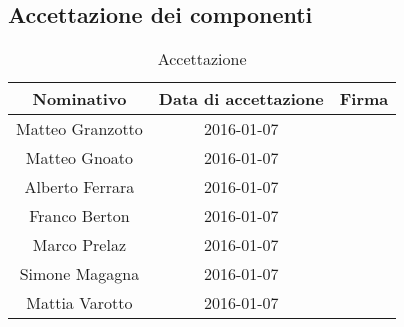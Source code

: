 \subsection{Accettazione dei componenti}
\begin{table}[htbp]
	\begin{center}
		\setlength{\extrarowheight}{\jot}
		\begin{tabular}{|c|c|p{6cm}|}
			\hline
			\textbf{Nominativo} & \textbf{Data di accettazione} & \textbf{Firma} \\[1ex]
			\hline
			Matteo Granzotto	&	2016-01-07	&		\\[1ex]
			\hline
			Matteo Gnoato		&	2016-01-07	&		\\[1ex]
			\hline
			Alberto Ferrara		&	2016-01-07	&		\\[1ex]
			\hline
			Franco Berton		&	2016-01-07	&		\\[1ex]
			\hline
			Marco Prelaz		&	2016-01-07	&		\\[1ex]
			\hline
			Simone Magagna		&	2016-01-07	&		\\[1ex]
			\hline
			Mattia Varotto		&	2016-01-07	&		\\[1ex]
			\hline
		\end{tabular}
	\end{center}
	\caption{Accettazione}
\end{table}

